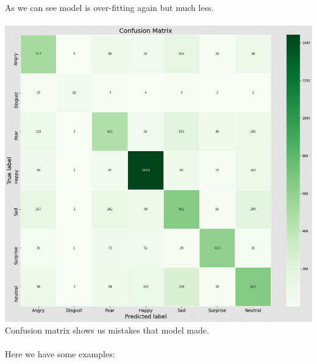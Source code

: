 As we can see model is over-fitting again but much less.\\
\\
\includegraphics[scale=0.60]{images/modelTwo/matrixTwo.png}
Confusion matrix shows us mistakes that model made.\\
\\
Here we have some examples:
